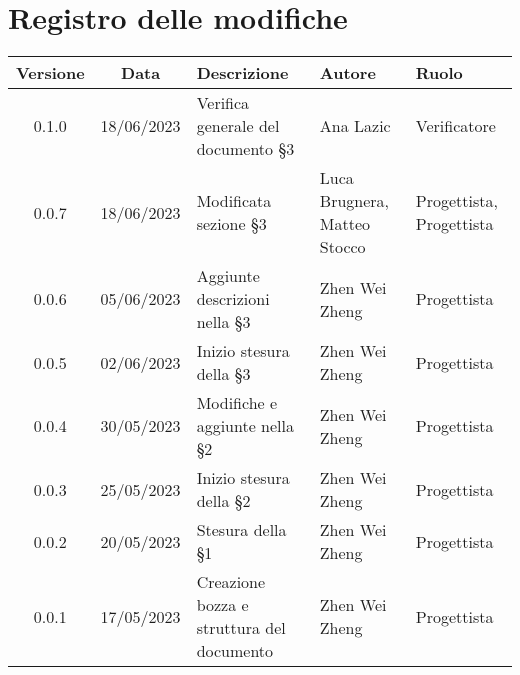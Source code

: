 \section*{Registro delle modifiche}
\begin{center}
\setlength\extrarowheight{5pt}
\renewcommand\tabularxcolumn[1]{>{\Centering}m{#1}}
\begin{tabularx}{\textwidth}{| c | c | X | X | X |} 
	\hline
	\rowcolor{white}
	\textbf{Versione} & \textbf{Data} & \textbf{Descrizione} & \textbf{Autore} & \textbf{Ruolo}\\
	\hline
	0.1.0 & 18/06/2023 & Verifica generale del documento §3 & Ana Lazic & Verificatore\\
	\hline
	0.0.7 & 18/06/2023 & Modificata sezione §3 & Luca Brugnera, Matteo Stocco & Progettista, Progettista\\
	\hline
	0.0.6 & 05/06/2023 & Aggiunte descrizioni nella §3 & Zhen Wei Zheng & Progettista\\
	\hline
	0.0.5 & 02/06/2023 & Inizio stesura della §3 & Zhen Wei Zheng & Progettista\\
	\hline
	0.0.4 & 30/05/2023 & Modifiche e aggiunte nella §2 & Zhen Wei Zheng & Progettista\\
	\hline
	0.0.3 & 25/05/2023 & Inizio stesura della §2 & Zhen Wei Zheng & Progettista\\
	\hline
	0.0.2 & 20/05/2023 & Stesura della §1 & Zhen Wei Zheng & Progettista\\
	\hline
	0.0.1 & 17/05/2023 & Creazione bozza e struttura del documento & Zhen Wei Zheng & Progettista\\
	\hline
	\end{tabularx}
\end{center}
